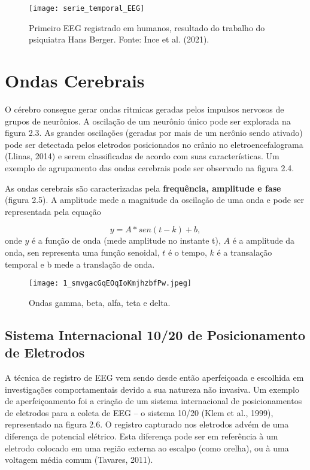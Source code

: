   \begin{figure}[h]
    \centering
    \texttt{[image: serie\_temporal\_EEG]}
    \caption[]{Primeiro EEG registrado em humanos, resultado do trabalho do psiquiatra Hans Berger. Fonte: Ince et al. (2021).} 
    \end{figure}

\section{Ondas Cerebrais}
O cérebro consegue gerar ondas ritmicas geradas pelos impulsos nervosos de grupos de neurônios. 
A oscilação de um neurônio único pode ser explorada na figura 2.3. As grandes oscilações (geradas por 
mais de um nerônio sendo ativado) pode ser detectada pelos eletrodos posicionados 
no crânio no eletroencefalograma (Llinas, 2014) e serem classificadas de acordo com suas características.
Um exemplo de agrupamento das ondas cerebrais pode ser observado na figura 2.4. 

As ondas cerebrais são caracterizadas pela \textbf{frequência, amplitude e fase} (figura 2.5). 
A amplitude mede a magnitude da oscilação de uma onda e pode ser representada pela equação

\begin{equation}
    y = A * sen (t - k) + b,
\end{equation}
onde $y$ é a função de onda (mede amplitude no instante t), $A$ é a amplitude da onda, sen representa
uma função senoidal, $t$ é o tempo, $k$ é a transalação temporal e b mede a translação de onda. 


\begin{figure}[h]
    \centering
    \texttt{[image: 1\_smvgacGqEOqIoKmjhzbfPw.jpeg]}
    \caption[]{Ondas gamma, beta, alfa, teta e delta.} 
    \end{figure}


\subsection{Sistema Internacional 10/20 de Posicionamento de Eletrodos} 

    A técnica de registro de EEG vem sendo desde então aperfeiçoada e escolhida em
    investigações comportamentais devido a sua natureza não invasiva. Um exemplo de
    aperfeiçoamento foi a criação de um sistema internacional de posicionamentos de
    eletrodos para a coleta de EEG – o sistema 10/20 (Klem et al., 1999), 
    representado na figura 2.6.
    O registro capturado nos eletrodos
    advém de uma diferença de potencial elétrico. Esta diferença pode ser em referência à
    um eletrodo colocado em uma região externa ao escalpo (como orelha), ou à uma
    voltagem média comum (Tavares, 2011).


